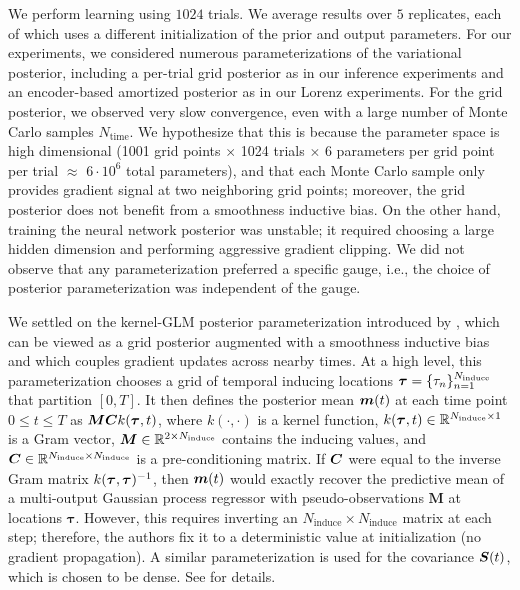 We perform learning using $1024$ trials. 
We average results over $5$ replicates, each of which uses a different initialization of the  prior and output parameters.
For our experiments, we considered numerous parameterizations of the variational posterior, including a per-trial grid posterior as in our inference experiments and an encoder-based amortized posterior as in our Lorenz experiments. 
For the grid posterior, we observed very slow convergence, even with a large number of Monte Carlo samples $N_{\mathrm{time}}$.
We hypothesize that this is because the parameter space is high dimensional (1001 grid points $\times$ 1024 trials $\times$ 6 parameters per grid point per trial $\approx$ $6 \cdot 10^6$ total parameters), and that each Monte Carlo sample only provides gradient signal at two neighboring grid points; moreover, the grid posterior does not benefit from a smoothness inductive bias.
On the other hand, training the neural network posterior was unstable; it required choosing a large hidden dimension and performing aggressive gradient clipping.
We did not observe that any parameterization preferred a specific gauge, i.e., the choice of posterior parameterization was independent of the gauge. 

We settled on the kernel-GLM posterior parameterization introduced by \citet{course2023state}, which can be viewed as a grid posterior augmented with a smoothness inductive bias and which couples gradient updates across nearby times.
At a high level, this parameterization chooses a grid of temporal inducing locations $\boldsymbol{\tau} = \{\tau_n\}_{n=1}^{N_{\mathrm{induce}}}$ that partition $[0, T]$. 
It then defines the posterior mean $\boldsymbol{m}(t)$ at each time point $0 \leq t \leq T$ as $\boldsymbol{M} \boldsymbol{C} k(\boldsymbol{\tau}, t)$, where $k(\cdot, \cdot)$ is a kernel function, $k(\boldsymbol{\tau}, t) \in \mathbb{R}^{N_{\mathrm{induce}} \times 1}$ is a Gram vector, $\boldsymbol{M} \in \mathbb{R}^{2 \times N_{\mathrm{induce}}}$ contains the inducing values, and $\boldsymbol{C} \in \mathbb{R}^{N_{\mathrm{induce}} \times N_{\mathrm{induce}}}$ is a pre-conditioning matrix. 
If $\boldsymbol{C}$ were equal to the inverse Gram matrix $k(\boldsymbol{\tau}, \boldsymbol{\tau})^{-1}$, then $\boldsymbol{m}(t)$ would exactly recover the predictive mean of a multi-output Gaussian process regressor with pseudo-observations $\bm{M}$ at locations $\bm{\tau}$.
However, this requires inverting an $N_{\mathrm{induce}} \times N_{\mathrm{induce}}$ matrix at each step; therefore, the authors fix it to a deterministic value at initialization (no gradient propagation).
A similar parameterization is used for the covariance $\boldsymbol{S}(t)$, which is chosen to be dense.
See \cite{course2023state} for details. 



